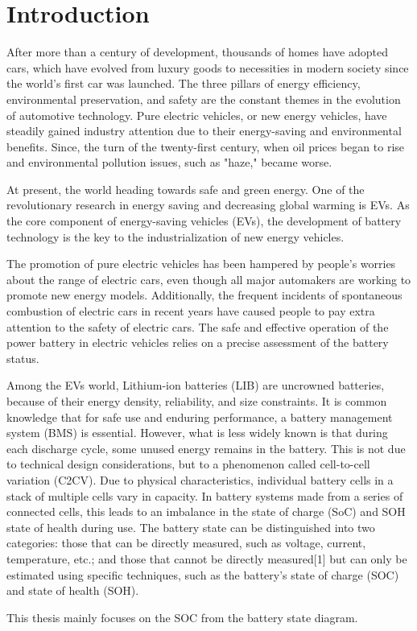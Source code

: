 \chapter*{Introduction}\label{intro}

After more than a century of development, thousands of homes have adopted cars, which have evolved from luxury goods to necessities in modern society since the world's first car was launched. The three pillars of energy efficiency, environmental preservation, and safety are the constant themes in the evolution of automotive technology. Pure electric vehicles, or new energy vehicles, have steadily gained industry attention due to their energy-saving and environmental benefits. Since, the turn of the twenty-first century, when oil prices began to rise and environmental pollution issues, such as "haze," became worse. %

At present, the world heading towards safe and green energy. One of the revolutionary research in energy saving and decreasing global warming is EVs. As the core component of energy-saving vehicles (EVs), the development of battery technology is the key to the industrialization of new energy vehicles. 

The promotion of pure electric vehicles has been hampered by people's worries about the range of electric cars, even though all major automakers are working to promote new energy models. Additionally, the frequent incidents of spontaneous combustion of electric cars in recent years have caused people to pay extra attention to the safety of electric cars. The safe and effective operation of the power battery in electric vehicles relies on a precise assessment of the battery status.

Among the EVs world, Lithium-ion batteries (LIB)  are uncrowned batteries, because of their energy density, reliability, and size constraints.  It is common knowledge that for safe use and enduring performance, a battery management system (BMS) is essential. However, what is less widely known is that during each discharge cycle, some unused energy remains in the battery. This is not due to technical design considerations, but to a phenomenon called cell-to-cell variation (C2CV). Due to physical characteristics, individual battery cells in a stack of multiple cells vary in capacity. In battery systems made from a series of connected cells, this leads to an imbalance in the state of charge (SoC) and SOH state of health during use. 
The battery state can be distinguished into two categories: those that can be directly measured, such as voltage, current, temperature, etc.; and those that cannot be directly measured[1] but can only be estimated using specific techniques, such as the battery's state of charge (SOC) and state of health (SOH).

This thesis mainly focuses on the SOC from the battery state diagram.

